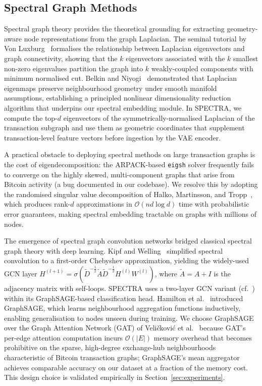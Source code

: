 \subsection{Spectral Graph Methods}
\label{subsec:spectral}

Spectral graph theory provides the theoretical grounding for extracting
geometry-aware node representations from the graph Laplacian.  The seminal
tutorial by Von Luxburg~\cite{VonLuxburg2007} formalises the relationship
between Laplacian eigenvectors and graph connectivity, showing that the $k$
eigenvectors associated with the $k$ smallest non-zero eigenvalues partition the
graph into $k$ weakly-coupled components with minimum normalised cut.  Belkin
and Niyogi~\cite{Belkin2003} demonstrated that Laplacian eigenmaps preserve
neighbourhood geometry under smooth manifold assumptions, establishing a
principled nonlinear dimensionality reduction algorithm that underpins our
spectral embedding module.  In SPECTRA, we compute the top-$d$ eigenvectors of
the symmetrically-normalised Laplacian of the transaction subgraph and use them
as geometric coordinates that supplement transaction-level feature vectors
before ingestion by the VAE encoder.

A practical obstacle to deploying spectral methods on large transaction graphs
is the cost of eigendecomposition: the ARPACK-based \texttt{eigsh} solver
frequently fails to converge on the highly skewed, multi-component graphs that
arise from Bitcoin activity (a bug documented in our codebase).  We resolve this
by adopting the randomised singular value decomposition of Halko, Martinsson,
and Tropp~\cite{Halko2011}, which produces rank-$d$ approximations in
$\mathcal{O}(n d \log d)$ time with probabilistic error guarantees, making
spectral embedding tractable on graphs with millions of nodes.

The emergence of spectral graph convolution networks bridged classical spectral
graph theory with deep learning.  Kipf and Welling~\cite{Kipf2017} simplified
spectral convolution to a first-order Chebyshev approximation, yielding the
widely-used GCN layer $H^{(l+1)} = \sigma\!\left(\tilde{D}^{-\frac{1}{2}}
\tilde{A}\tilde{D}^{-\frac{1}{2}} H^{(l)} W^{(l)}\right)$, where
$\tilde{A} = A + I$ is the adjacency matrix with self-loops.  SPECTRA uses a
two-layer GCN variant (cf.~\cite{Kipf2016b}) within its GraphSAGE-based
classification head.  Hamilton et al.~\cite{Hamilton2017} introduced
GraphSAGE, which learns neighbourhood aggregation functions inductively,
enabling generalisation to nodes unseen during training.  We choose GraphSAGE
over the Graph Attention Network (GAT) of Veli\v{c}kovi\'{c} et
al.~\cite{Velickovic2018} because GAT's per-edge attention computation incurs
$\mathcal{O}(|E|)$ memory overhead that becomes prohibitive on the sparse,
high-degree exchange-hub neighbourhoods characteristic of Bitcoin transaction
graphs; GraphSAGE's mean aggregator achieves comparable accuracy on our dataset
at a fraction of the memory cost.  This design choice is validated empirically
in Section~\ref{sec:experiments}.

